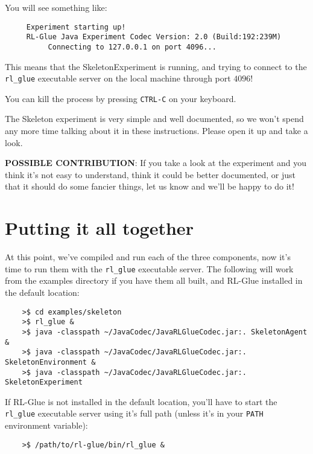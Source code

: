 \documentclass[11pt]{article}
\begin{document}
You will see something like:
\begin{verbatim}
     Experiment starting up!
     RL-Glue Java Experiment Codec Version: 2.0 (Build:192:239M)
          Connecting to 127.0.0.1 on port 4096...
\end{verbatim}

This means that the SkeletonExperiment is running, and trying to connect to the \texttt{rl\_glue} executable server on the local machine through port $4096$!  

You can kill the process by pressing \texttt{CTRL-C} on your keyboard.


The Skeleton experiment is very simple and well documented, so we won't spend any more time talking about it in these instructions.
Please open it up and take a look.

\textbf{POSSIBLE CONTRIBUTION}: If you take a look at the experiment and you think it's not easy to understand, think it could be better documented, 
or just that it should do some fancier things, let us know and we'll be happy to do it!

\section{Putting it all together}
At this point, we've compiled and run each of the three components, now it's time to run them with the \texttt{rl\_glue} executable server.  The following will work from the examples 
directory if you have them all built, and RL-Glue installed in the default location:
\begin{verbatim}
	>$ cd examples/skeleton
	>$ rl_glue &
	>$ java -classpath ~/JavaCodec/JavaRLGlueCodec.jar:. SkeletonAgent &
	>$ java -classpath ~/JavaCodec/JavaRLGlueCodec.jar:. SkeletonEnvironment &
	>$ java -classpath ~/JavaCodec/JavaRLGlueCodec.jar:. SkeletonExperiment
\end{verbatim}

If RL-Glue is not installed in the default location, you'll have to start the \texttt{rl\_glue} executable server using it's full path (unless it's in your \texttt{PATH} environment variable):
\begin{verbatim}
	>$ /path/to/rl-glue/bin/rl_glue &
\end{verbatim}
\end{document}
